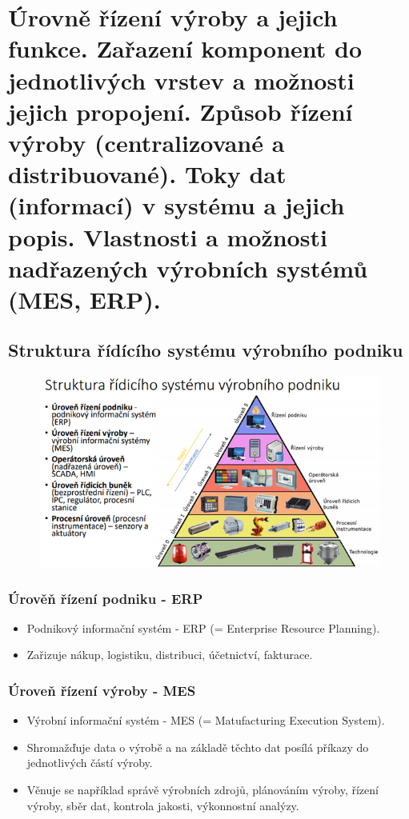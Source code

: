 \section{Úrovně řízení výroby a jejich funkce. Zařazení komponent do jednotlivých vrstev a možnosti jejich propojení. Způsob řízení výroby (centralizované a distribuované). Toky dat (informací) v systému a jejich popis. Vlastnosti a možnosti nadřazených výrobních systémů (MES, ERP).}
\subsection{Struktura řídícího systému výrobního podniku}
\begin{figure}[h]
    \begin{center}
      \includegraphics[width=\textwidth]{img/rizeni.png}
    \end{center}
  \end{figure}

\subsubsection*{Úrověň řízení podniku - ERP}
\begin{itemize}
    \item Podnikový informační systém - ERP (= Enterprise Resource Planning).
    \item Zařizuje nákup, logistiku, distribuci, účetnictví, fakturace.
\end{itemize}

\subsubsection*{Úroveň řízení výroby - MES}
\begin{itemize}
    \item Výrobní informační systém - MES (= Matufacturing Execution System).
    \item Shromažďuje data o výrobě a na základě těchto dat posílá příkazy do jednotlivých částí výroby.
    \item Věnuje se například správě výrobních zdrojů, plánováním výroby, řízení výroby, sběr dat, kontrola jakosti, výkonnostní analýzy.
\end{itemize}

